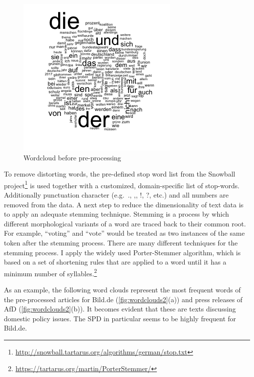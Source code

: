 \documentclass[
]{article}
\begin{document}
\begin{figure}

{\centering \includegraphics[width=0.4\linewidth]{../figs/wordcloud} 

}

\caption{Wordcloud before pre-processing \label{fig:wordcloud1}}\label{fig:wordcloud pre-processing}
\end{figure}

To remove distorting words, the pre-defined stop word list from the
Snowball project\footnote{\url{http://snowball.tartarus.org/algorithms/german/stop.txt}}
is used together with a customized, domain-specific list of stop-words.
Additionally punctuation character (e.g.~., ,, !, ?, etc.) and all
numbers are removed from the data. A next step to reduce the
dimensionality of text data is to apply an adequate stemming technique.
Stemming is a process by which different morphological variants of a
word are traced back to their common root. For example, ``voting'' and
``vote'' would be treated as two instances of the same token after the
stemming process. There are many different techniques for the stemming
process. I apply the widely used Porter-Stemmer algorithm, which is
based on a set of shortening rules that are applied to a word until it
has a minimum number of syllables.\footnote{\url{https://tartarus.org/martin/PorterStemmer/}}

As an example, the following word clouds represent the most frequent
words of the pre-processed articles for Bild.de
(\autoref{fig:wordclouds2}(a)) and press releases of AfD
(\autoref{fig:wordclouds2}(b)). It becomes evident that these are texts
discussing domestic policy issues. The SPD in particular seems to be
highly frequent for Bild.de.
\end{document}
